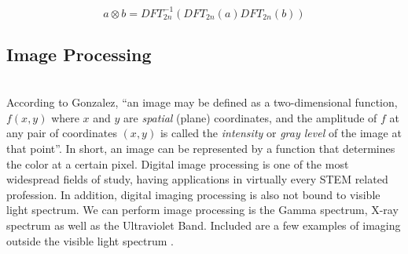 \documentclass{amsproc}
\begin{document}
$$
a \otimes b = DFT_{2n}^{-1}(DFT_{2n}(a) DFT_{2n}(b))
$$

\subsection{Image Processing}

\mbox{}	 \\
\indent According to Gonzalez, ``an image may be defined as a two-dimensional function, $f(x, y)$ where $x$ and $y$ are \textit{spatial} (plane) coordinates, and the amplitude of $f$ at any pair of coordinates $(x, y)$ is called the \textit{intensity} or \textit{gray level} of the image at that point''. In short, an image can be represented by a function that determines the color at a certain pixel. Digital image processing is one of the most widespread fields of study, having applications in virtually every STEM related profession. In addition, digital imaging processing is also not bound to visible light spectrum. We can perform image processing is the Gamma spectrum, X-ray spectrum as well as the Ultraviolet Band. Included are a few examples of imaging outside the visible light spectrum \cite{Gonzalez}.
\end{document}
